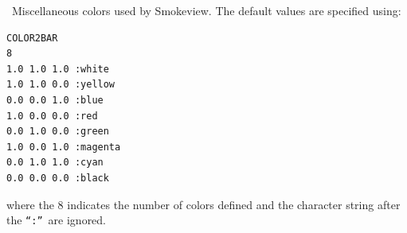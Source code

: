 \documentclass[11pt,twoside]{book}
\newcommand{\hitem}[1]{\item[{\bf #1} \hfill]}
\begin{document}
\hitem{COLOR2BAR}\ Miscellaneous colors used by Smokeview.  The
default values are specified using:
\begin{lstlisting}
COLOR2BAR
8
1.0 1.0 1.0 :white
1.0 1.0 0.0 :yellow
0.0 0.0 1.0 :blue
1.0 0.0 0.0 :red
0.0 1.0 0.0 :green
1.0 0.0 1.0 :magenta
0.0 1.0 1.0 :cyan
0.0 0.0 0.0 :black
\end{lstlisting}

\noindent where the 8 indicates the number of colors defined and
the character string after the {\tt ``:''}\ are ignored.

%
%
%
%
\end{document}
